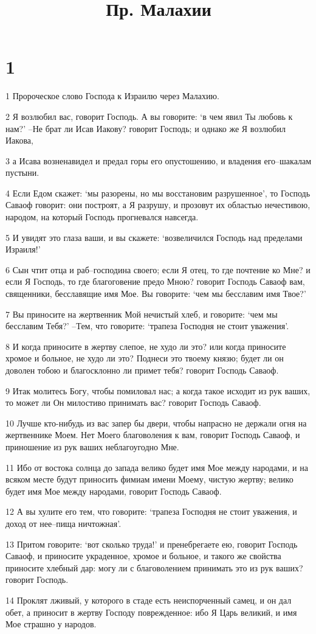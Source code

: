 

\title{Пр. Малахии}


\chapter{1}

\par 1 Пророческое слово Господа к Израилю через Малахию.
\par 2 Я возлюбил вас, говорит Господь. А вы говорите: `в чем явил Ты любовь к нам?' --Не брат ли Исав Иакову? говорит Господь; и однако же Я возлюбил Иакова,
\par 3 а Исава возненавидел и предал горы его опустошению, и владения его--шакалам пустыни.
\par 4 Если Едом скажет: `мы разорены, но мы восстановим разрушенное', то Господь Саваоф говорит: они построят, а Я разрушу, и прозовут их областью нечестивою, народом, на который Господь прогневался навсегда.
\par 5 И увидят это глаза ваши, и вы скажете: `возвеличился Господь над пределами Израиля!'
\par 6 Сын чтит отца и раб--господина своего; если Я отец, то где почтение ко Мне? и если Я Господь, то где благоговение предо Мною? говорит Господь Саваоф вам, священники, бесславящие имя Мое. Вы говорите: `чем мы бесславим имя Твое?'
\par 7 Вы приносите на жертвенник Мой нечистый хлеб, и говорите: `чем мы бесславим Тебя?' --Тем, что говорите: `трапеза Господня не стоит уважения'.
\par 8 И когда приносите в жертву слепое, не худо ли это? или когда приносите хромое и больное, не худо ли это? Поднеси это твоему князю; будет ли он доволен тобою и благосклонно ли примет тебя? говорит Господь Саваоф.
\par 9 Итак молитесь Богу, чтобы помиловал нас; а когда такое исходит из рук ваших, то может ли Он милостиво принимать вас? говорит Господь Саваоф.
\par 10 Лучше кто-нибудь из вас запер бы двери, чтобы напрасно не держали огня на жертвеннике Моем. Нет Моего благоволения к вам, говорит Господь Саваоф, и приношение из рук ваших неблагоугодно Мне.
\par 11 Ибо от востока солнца до запада велико будет имя Мое между народами, и на всяком месте будут приносить фимиам имени Моему, чистую жертву; велико будет имя Мое между народами, говорит Господь Саваоф.
\par 12 А вы хулите его тем, что говорите: `трапеза Господня не стоит уважения, и доход от нее--пища ничтожная'.
\par 13 Притом говорите: `вот сколько труда!' и пренебрегаете ею, говорит Господь Саваоф, и приносите украденное, хромое и больное, и такого же свойства приносите хлебный дар: могу ли с благоволением принимать это из рук ваших? говорит Господь.
\par 14 Проклят лживый, у которого в стаде есть неиспорченный самец, и он дал обет, а приносит в жертву Господу поврежденное: ибо Я Царь великий, и имя Мое страшно у народов.


